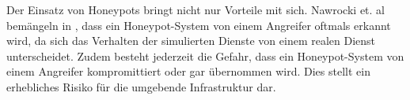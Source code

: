Der Einsatz von Honeypots bringt nicht nur Vorteile mit sich. Nawrocki et. al bemängeln in \cite{NawrockiWSKS16}, dass ein Honeypot-System von einem Angreifer oftmals erkannt wird, da sich das Verhalten der simulierten Dienste von einem realen Dienst unterscheidet. Zudem besteht jederzeit die Gefahr, dass ein Honeypot-System von einem Angreifer kompromittiert oder gar übernommen wird. Dies stellt ein erhebliches Risiko für die umgebende Infrastruktur dar.